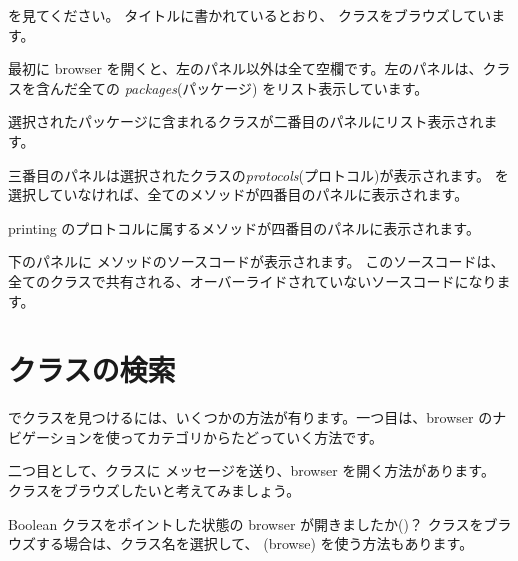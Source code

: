 \documentclass[a4paper,10pt,twoside]{book}
\begin{document}
{ を見てください。
タイトルに書かれているとおり、 クラスをブラウズしています。

最初に browser を開くと、左のパネル以外は全て空欄です。左のパネルは、クラスを含んだ全ての \emph{packages}(パッケージ) をリスト表示しています。

選択されたパッケージに含まれるクラスが二番目のパネルにリスト表示されます。

三番目のパネルは選択されたクラスの\emph{protocols}(プロトコル)が表示されます。
 を選択していなければ、全てのメソッドが四番目のパネルに表示されます。

printing のプロトコルに属するメソッドが四番目のパネルに表示されます。

下のパネルに メソッドのソースコードが表示されます。
このソースコードは、全てのクラスで共有される、オーバーライドされていないソースコードになります。

\section{クラスの検索}

\pharo でクラスを見つけるには、いくつかの方法が有ります。一つ目は、browser のナビゲーションを使ってカテゴリからたどっていく方法です。

二つ目として、クラスに  メッセージを送り、browser を開く方法があります。 クラスをブラウズしたいと考えてみましょう。

Boolean クラスをポイントした状態の browser が開きましたか()？
クラスをブラウズする場合は、クラス名を選択して、  (browse) を使う方法もあります。


}
\end{document}
